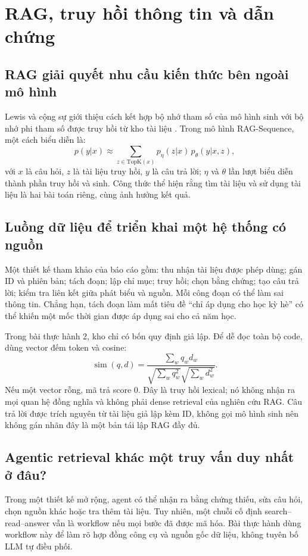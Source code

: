 \newpage
\section{RAG, truy hồi thông tin và dẫn chứng}
\subsection{RAG giải quyết nhu cầu kiến thức bên ngoài mô hình}
Lewis và cộng sự giới thiệu cách kết hợp bộ nhớ tham số của mô hình sinh với bộ nhớ
phi tham số được truy hồi từ kho tài liệu \cite{rag}. Trong mô hình RAG-Sequence,
một cách biểu diễn là:
\[
p(y|x)\approx\sum_{z\in\mathrm{TopK}(x)}p_{\eta}(z|x)\,p_{\theta}(y|x,z),
\]
với $x$ là câu hỏi, $z$ là tài liệu truy hồi, $y$ là câu trả lời; $\eta$ và $\theta$
lần lượt biểu diễn thành phần truy hồi và sinh. Công thức thể hiện rằng tìm tài liệu
và sử dụng tài liệu là hai bài toán riêng, cùng ảnh hưởng kết quả.

\subsection{Luồng dữ liệu để triển khai một hệ thống có nguồn}
Một thiết kế tham khảo của báo cáo gồm: thu nhận tài liệu được phép dùng; gán ID và
phiên bản; tách đoạn; lập chỉ mục; truy hồi; chọn bằng chứng; tạo câu trả lời; kiểm tra
liên kết giữa phát biểu và nguồn. Mỗi công đoạn có thể làm sai thông tin. Chẳng hạn,
tách đoạn làm mất tiêu đề ``chỉ áp dụng cho học kỳ hè'' có thể khiến một mốc thời gian
được áp dụng sai cho cả năm học.

Trong bài thực hành 2, kho chỉ có bốn quy định giả lập. Để dễ đọc toàn bộ code, dùng
vector đếm token và cosine:
\[
\operatorname{sim}(q,d)=\frac{\sum_w q_w d_w}{\sqrt{\sum_w q_w^2}\sqrt{\sum_w d_w^2}}.
\]
Nếu một vector rỗng, mã trả score 0. Đây là truy hồi lexical; nó không nhận ra mọi
quan hệ đồng nghĩa và không phải dense retrieval của nghiên cứu RAG. Câu trả lời được
trích nguyên từ tài liệu giả lập kèm ID, không gọi mô hình sinh nên không gán nhãn đây
là một bản tái lập RAG đầy đủ.

\subsection{Agentic retrieval khác một truy vấn duy nhất ở đâu?}
Trong một thiết kế mở rộng, agent có thể nhận ra bằng chứng thiếu, sửa câu hỏi, chọn
nguồn khác hoặc tra thêm tài liệu. Tuy nhiên, một chuỗi cố định search--read--answer
vẫn là workflow nếu mọi bước đã được mã hóa. Bài thực hành dùng workflow này để làm
rõ hợp đồng công cụ và nguồn gốc dữ liệu, không tuyên bố LLM tự điều phối.

